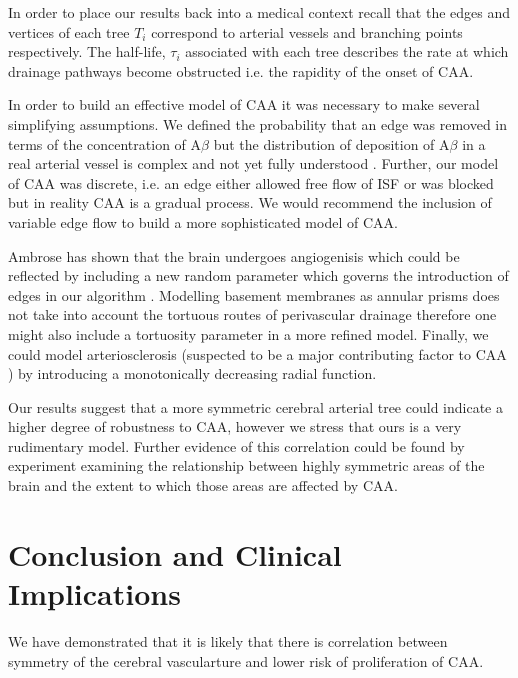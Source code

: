 \documentclass[10pt]{amsart} %
\theoremstyle{definition}
\begin{document}
In order to place our results back into a medical context recall that the edges and vertices of each tree $T_i$ correspond to arterial vessels and branching points respectively.  The half-life, $\tau_i$ associated with each tree describes the rate at which drainage pathways become obstructed i.e. the rapidity of the onset of CAA.  

In order to build an effective model of CAA it was necessary to make several simplifying assumptions.  We defined the probability that an edge was removed in terms of the concentration of A$\beta$ but the distribution of deposition of A$\beta$ in a real arterial vessel is complex and not yet fully understood \cite{yow}.  Further, our model of CAA was discrete, i.e. an edge either allowed free flow of ISF or was blocked but in reality CAA is a gradual process.  We would recommend the inclusion of variable edge flow to build a more sophisticated model of CAA. 

Ambrose has shown that the brain undergoes angiogenisis which could be reflected by including a new random parameter which governs the introduction of edges in our algorithm \cite{ambrose}.   Modelling basement membranes as annular prisms does not take into account the tortuous routes of perivascular drainage therefore one might also include a tortuosity parameter in a more refined model.  Finally, we could model arteriosclerosis (suspected to be a major contributing factor to CAA \cite{yow,
weller2002})  by 
introducing a monotonically decreasing radial function. 

Our results suggest that a more symmetric cerebral arterial tree could indicate a higher degree of robustness to CAA, however we stress that ours is a very rudimentary model.  Further evidence of this correlation could be found by experiment examining the relationship between highly symmetric areas of the brain and the extent to which those areas are affected by CAA. 

\section{Conclusion and Clinical Implications}

We have demonstrated that it is likely that there is correlation between symmetry of the cerebral vascularture and lower risk of proliferation of CAA.  




{}
\end{document}

